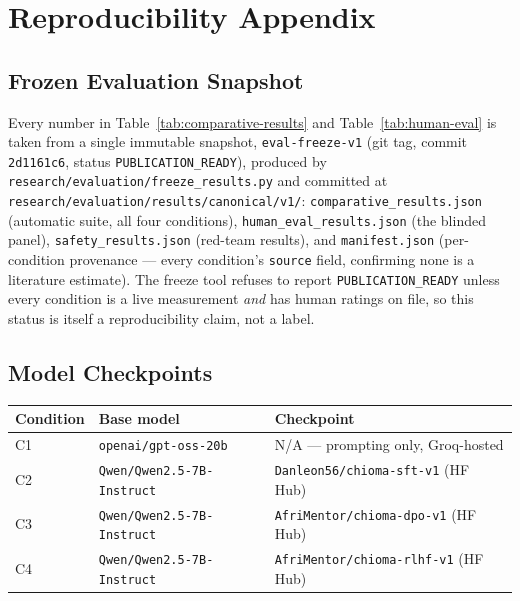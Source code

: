 \section{Reproducibility Appendix}
\label{sec:appendix-reproducibility}

\subsection{Frozen Evaluation Snapshot}
\label{subsec:appendix-freeze}
Every number in Table~\ref{tab:comparative-results} and Table~\ref{tab:human-eval} is taken from a single immutable snapshot, \texttt{eval-freeze-v1} (git tag, commit \texttt{2d1161c6}, status \texttt{PUBLICATION\_READY}), produced by \texttt{research/evaluation/freeze\_results.py} and committed at \texttt{research/evaluation/results/canonical/v1/}: \texttt{comparative\_results.json} (automatic suite, all four conditions), \texttt{human\_eval\_results.json} (the blinded panel), \texttt{safety\_results.json} (red-team results), and \texttt{manifest.json} (per-condition provenance — every condition's \texttt{source} field, confirming none is a literature estimate). The freeze tool refuses to report \texttt{PUBLICATION\_READY} unless every condition is a live measurement \emph{and} has human ratings on file, so this status is itself a reproducibility claim, not a label.

\subsection{Model Checkpoints}
\label{subsec:appendix-checkpoints}
\begin{center}
\small
\begin{tabular}{lll}
\toprule
Condition & Base model & Checkpoint \\
\midrule
C1 & \texttt{openai/gpt-oss-20b} & N/A — prompting only, Groq-hosted \\
C2 & \texttt{Qwen/Qwen2.5-7B-Instruct} & \texttt{Danleon56/chioma-sft-v1} (HF Hub) \\
C3 & \texttt{Qwen/Qwen2.5-7B-Instruct} & \texttt{AfriMentor/chioma-dpo-v1} (HF Hub) \\
C4 & \texttt{Qwen/Qwen2.5-7B-Instruct} & \texttt{AfriMentor/chioma-rlhf-v1} (HF Hub) \\
\bottomrule
\end{tabular}
\end{center}

